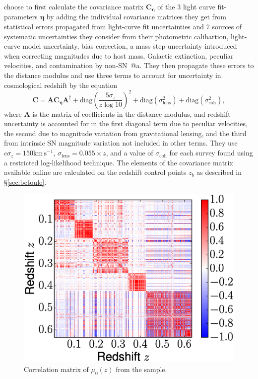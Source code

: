 \documentclass[12pt,a4paper]{article}
\makeatletter
\newcommand*{\rom}[1]{\expandafter\@slowromancap\romannumeral #1@}
\newcommand{\sn}{\mbox{SN}}
\newcommand{\sna}{\mbox{SN \rom{1}a}}
\makeatother
\begin{document}
{\citet{betoule2014} choose to first calculate the covariance matrix $\mathbf{C}_{\mathbf{\eta}}$ of the 3 light curve fit-parameters $\mathbf{\eta}$ by adding the individual covariance matrices they get from statistical errors propagated from light-curve fit uncertainties and 7 sources of systematic uncertainties they consider from their photometric calibartion, light-curve model uncertainty, bias correction, a mass step uncertainty introduced when correcting magnitudes due to host mass, Galactic extinction, peculiar velocities, and contamination by non-\sna{}. They then propagate these errors to the distance modulus and use three terms to account for uncertainty in cosmological redshift by the equation
\begin{equation}
\label{eq:BetouleCovMatrix}
\mathbf{C} = \mathbf{A} \mathbf{C}_\mathbf{\eta} \mathbf{A}^\dag + \mathrm{diag}\left(\frac{5 \sigma_z}{z \log 10}\right)^2 + \mathrm{diag}\left(\sigma_{\mathrm{lens}}^2\right) + \mathrm{diag}\left(\sigma_{\mathrm{coh}}^2\right),
\end{equation}
where $\mathbf{A}$ is the matrix of coefficients in the distance modulus, and redshift uncertainty is accounted for in the first diagonal term due to peculiar velocities, the second due to magnitude variation from gravitational lensing, and the third from intrinsic \sn{} magnitude variation not included in other terms. They use $c \sigma_z = 150 \mathrm{km}\, \mathrm{s}^{-1}$, $\sigma_{\mathrm{lens}} = 0.055 \times z$, and a value of $\sigma_{\mathrm{coh}}$ for each survey found using a restricted log-likelihood technique. The elements of the covariance matrix available online are calculated on the redshift control points $z_b$ as described in \S \ref{sec:betoule}.

\begin{figure}
 \includegraphics[width=\linewidth]{figures/Rest_correlation.eps}
 \caption{Correlation matrix of $\mu_0(z)$ from the
 \citet{rest2014} sample.}
 \label{fig:cmatrix}
\end{figure}

}
\end{document}
